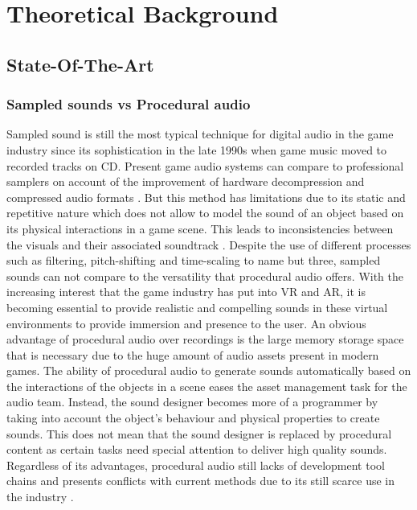 \chapter{Theoretical Background}\label{ch:theory}

\section{State-Of-The-Art}\label{sec:state_art}

\subsection{Sampled sounds vs Procedural audio}

Sampled sound is still the most typical technique for digital audio in the game industry since its sophistication in the late 1990s when game music moved to recorded tracks on CD. Present game audio systems can compare to professional samplers on account of the improvement of hardware decompression and compressed audio formats \cite{farnell2007introduction}. But this method has limitations due to its static and repetitive nature which does not allow to model the sound of an object based on its physical interactions in a game scene. This leads to inconsistencies between the visuals and their associated soundtrack \cite{picard2009expressive}. Despite the use of different processes such as filtering, pitch-shifting and time-scaling to name but three, sampled sounds can not compare to the versatility that procedural audio offers. With the increasing interest that the game industry has put into \gls{VR} and \gls{AR}, it is becoming essential to provide realistic and compelling sounds in these virtual environments to provide immersion and presence to the user. An obvious advantage of procedural audio over recordings is the large memory storage space that is necessary due to the huge amount of audio assets present in modern games. The ability of procedural audio to generate sounds automatically based on the interactions of the objects in a scene eases the asset management task for the audio team. Instead, the sound designer becomes more of a programmer by taking into account the object’s behaviour and physical properties to create sounds. This does not mean that the sound designer is replaced by procedural content as certain tasks need special attention to deliver high quality sounds. Regardless of its advantages, procedural audio still lacks of development tool chains and presents conflicts with current methods due to its still scarce use in the industry \cite{farnell2010designing}.

